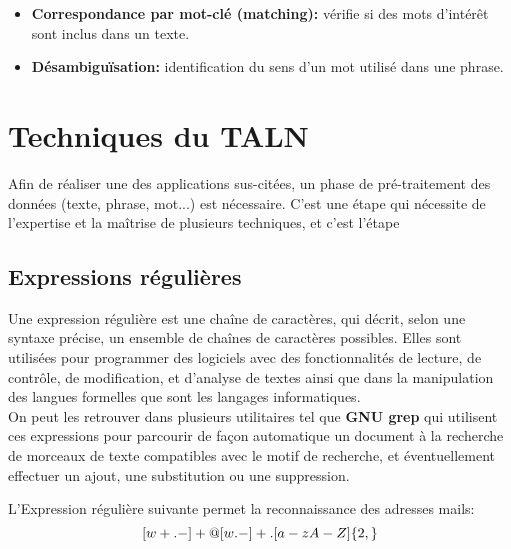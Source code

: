 \documentclass{report}
\begin{document}
    \begin{itemize}
        \item \textbf{Correspondance par mot-clé (matching):} vérifie si des mots d'intérêt sont inclus dans un texte. 
        \item \textbf{Désambiguïsation:} identification du sens d'un mot utilisé dans une phrase.
    \end{itemize}
    
\section{Techniques du TALN}
Afin de réaliser une des applications sus-citées, un phase de pré-traitement des données (texte, phrase, mot...) est nécessaire. C'est une étape qui nécessite de l'expertise et la maîtrise de plusieurs techniques, et c'est l'étape  

\subsection{Expressions régulières}
Une expression régulière est une chaîne de caractères, qui décrit, selon une syntaxe précise, un ensemble de chaînes de caractères possibles. Elles sont utilisées pour programmer des logiciels avec des fonctionnalités de lecture, de contrôle, de modification, et d'analyse de textes ainsi que dans la manipulation des langues formelles que sont les langages informatiques.\\
On peut les retrouver dans plusieurs utilitaires tel que \textbf{GNU grep} qui utilisent ces expressions pour parcourir de façon automatique un document à la recherche de morceaux de texte compatibles avec le motif de recherche, et éventuellement effectuer un ajout, une substitution ou une suppression.

L'Expression régulière suivante permet la reconnaissance des adresses mails:\\
$$[\\w+.-]+@[\\w.-]+\\.[a-zA-Z]\{2,\}$$

    
\end{document}
